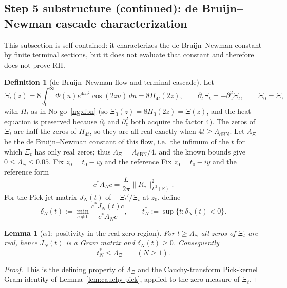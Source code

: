 \documentclass[11pt]{amsart}
\newtheorem{lemma}[theorem]{Lemma}
\theoremstyle{definition}
\newtheorem{definition}[theorem]{Definition}
\theoremstyle{remark}
\theoremstyle{definition}
\newcommand{\R}{\mathbb{R}}
\begin{document}
\subsection{Step 5 substructure (continued): de Bruijn--Newman cascade characterization}\label{subsec:cascade}

This subsection is self-contained: it characterizes the de Bruijn--Newman constant by finite terminal
sections, but it does not evaluate that constant and therefore does not prove RH.

\begin{definition}[de Bruijn--Newman flow and terminal cascade]\label{def:flow-defect}
Let
\[
   \Xi_t(z)=8\int_0^\infty \Phi(u)e^{4tu^2}\cos(2zu)\,du=8H_{4t}(2z),
   \qquad \partial_t\Xi_t=-\partial_z^2\Xi_t,\qquad \Xi_0=\Xi,
\]
with $H_t$ as in No-go~\ref{ng:dbn} (so $\Xi_0(z)=8H_0(2z)=\Xi(z)$, and the heat equation is preserved
because $\partial_t$ and $\partial_z^2$ both acquire the factor $4$).  The zeros of $\Xi_t$ are half
the zeros of $H_{4t}$, so they are all real exactly when $4t\ge\Lambda_{\mathrm{dBN}}$.  Let
$\Lambda_\Xi$ be the de Bruijn--Newman constant of this flow, i.e.\ the infimum of the $t$ for which
$\Xi_t$ has only real zeros; thus $\Lambda_\Xi=\Lambda_{\mathrm{dBN}}/4$, and the known bounds give
$0\le\Lambda_\Xi\le0.05$.  Fix $z_0=t_0-iy$ and the reference  Fix $z_0=t_0-iy$ and the reference
form
\[
   c^*A_Nc=\frac L{2\pi}\|R_c\|_{L^2(\R)}^2.
\]
For the Pick jet matrix $J_N(t)$ of $-\Xi_t'/\Xi_t$ at $z_0$, define
\[
   \delta_N(t):=\min_{c\ne0}\frac{c^*J_N(t)c}{c^*A_Nc},
   \qquad
   t_N^*:=\sup\{t:\delta_N(t)<0\}.
\]
\end{definition}

\begin{lemma}[$\alpha1$: positivity in the real-zero region]\label{lem:alpha1}
For $t\ge\Lambda_\Xi$ all zeros of $\Xi_t$ are real, hence $J_N(t)$ is a Gram matrix and
$\delta_N(t)\ge0$.  Consequently
\[
   t_N^*\le\Lambda_\Xi\qquad(N\ge1).
\]
\end{lemma}

\begin{proof}
This is the defining property of $\Lambda_\Xi$ and the Cauchy-transform Pick-kernel Gram
identity of Lemma~\ref{lem:cauchy-pick}, applied to the zero measure of $\Xi_t$.
\end{proof}
\end{document}
